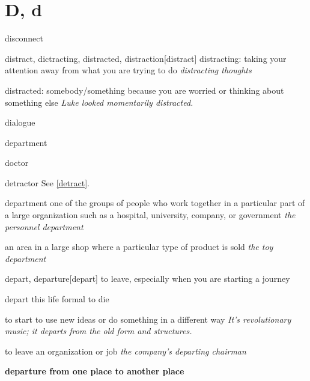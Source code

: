 \section{D, d}

\begin{word}{disconnect}
\end{word}

\begin{word}{distract, dictracting, distracted, distraction}[distract]
    distracting: taking your attention away from what you are trying to do
    \textit{distracting thoughts}

    distracted: somebody/something because you are worried or thinking about something else
    \textit{Luke looked momentarily distracted.}
\end{word}

\begin{word}{dialogue}
\end{word}

\begin{word}{department}
\end{word}

\begin{word}{doctor}
\end{word}

\begin{word}{detractor}
    See \ref{detract}.
\end{word}

\begin{word}{department}
    one of the groups of people who work together in a particular part of a large organization such as a hospital, university, company, or government
    \textit{the personnel department}

    an area in a large shop where a particular type of product is sold
    \textit{the toy department}
\end{word}

\begin{word}{depart, departure}[depart]
    to leave, especially when you are starting a journey

    depart this life formal to die

    to start to use new ideas or do something in a different way
    \textit{It's revolutionary music; it departs from the old form and structures.}

    to leave an organization or job
    \textit{the company's departing chairman}

    \textbf{departure from one place to another place}
\end{word}


